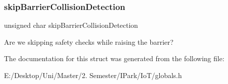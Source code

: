 \subsubsection{\texorpdfstring{skip\+Barrier\+Collision\+Detection}{skipBarrierCollisionDetection}}
{\footnotesize\ttfamily unsigned char skip\+Barrier\+Collision\+Detection}

Are we skipping safety checks while raising the barrier? 

The documentation for this struct was generated from the following file\+:\begin{DoxyCompactItemize}
\item 
E\+:/\+Desktop/\+Uni/\+Master/2. Semester/\+I\+Park/\+Io\+T/globals.\+h\end{DoxyCompactItemize}
